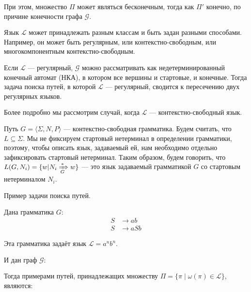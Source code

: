 При этом, множество $\Pi$ может являться бесконечным, тогда как $\Pi'$ конечно, по причине конечности графа $\mathcal{G}$.

Язык $\mathcal{L}$ может принадлежать разным классам и быть задан разными способами. Например, он может быть регулярным, или контекстно-свободным, или многокомпонентным контекстно-свободным.

Если $\mathcal{L}$ --- регулярный, $\mathcal{G}$ можно рассматривать как недетерминированный конечный автомат (НКА), в котором все вершины и стартовые, и конечные.
Тогда задача поиска путей, в которой $\mathcal{L}$ --- регулярный, сводится к пересечению двух регулярных языков.

Более подробно мы рассмотрим случай, когда $\mathcal{L}$ --- контекстно-свободный язык.

Путь $G = \langle \Sigma, N, P \rangle$ --- контекстно-свободная грамматика.
Будем считать, что $L \subseteq \Sigma$.
Мы не фиксируем стартовый нетерминал в определении грамматики, поэтому, чтобы описать язык, задаваемый ей, нам необходимо отдельно зафиксировать стартовый нетерминал.
Таким образом, будем говорить, что $L(G,N_i) = \{ w | N_i \xRightarrow[G]{*} w  \}$ --- это язык задаваемый грамматикой $G$ со стартовым нетерминалом $N_i$.

\begin{example}
    Пример задачи поиска путей.

    Дана грамматика  $G:$
    \begin{align*}
    S   &\to a b \\
    S   &\to a S b
    \end{align*}

    Эта грамматика задаёт язык $\mathcal{L} = a^n b^n$.

    И дан граф $\mathcal{G}:$

    \begin{center}
      
    \end{center}

    Тогда примерами путей, принадлежащих множеству $\Pi = \{\pi \mid \omega(\pi) \in \mathcal{L}\}$, являются:

    \begin{center}
        
    \end{center}

    \begin{center}
        
    \end{center}

\end{example}


